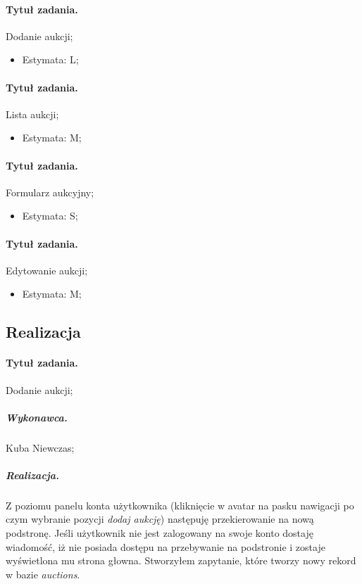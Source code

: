 \documentclass[a4paper]{article}
\begin{document}
	\paragraph{Tytuł zadania.} Dodanie aukcji;
	\begin{itemize}
		\item Estymata: L;
	\end{itemize}
	
	\paragraph{Tytuł zadania.} Lista aukcji;
	\begin{itemize}
		\item Estymata: M;
	\end{itemize}
	
	\paragraph{Tytuł zadania.} Formularz aukcyjny;
	\begin{itemize}
		\item Estymata: S;
	\end{itemize}
	
	\paragraph{Tytuł zadania.} Edytowanie aukcji;
	\begin{itemize}
		\item Estymata: M;
	\end{itemize}
	
	\subsection{Realizacja}
	
	\paragraph{Tytuł zadania.} Dodanie aukcji;
	\subparagraph{Wykonawca.} Kuba Niewczas;
	\subparagraph{Realizacja.} Z poziomu panelu konta użytkownika (kliknięcie w avatar na pasku nawigacji po czym wybranie pozycji \emph{dodaj aukcję}) następuję przekierowanie na nową podstronę. Jeśli użytkownik nie jest zalogowany na swoje konto dostaję wiadomość, iż nie posiada dostępu na przebywanie na podstronie i zostaje wyświetlona mu strona głowna. Stworzyłem zapytanie, które tworzy nowy rekord w bazie \emph{auctions}.
	
\end{document}
